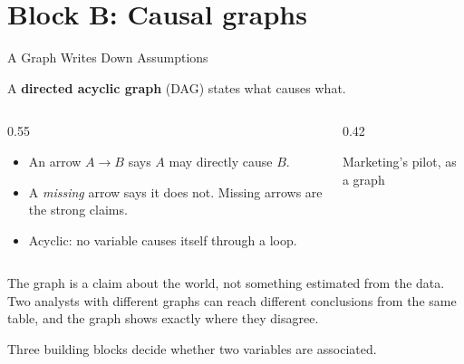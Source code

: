 \documentclass[aspectratio=169, 11pt, handout]{beamer}
\begin{document}
\section{Block B: Causal graphs}

\begin{frame}{A Graph Writes Down Assumptions}

A \textbf{directed acyclic graph} (DAG) states what causes what.

\begin{columns}[c]
\begin{column}{0.55\textwidth}
\begin{itemize}
  \item An arrow $A \to B$ says $A$ may directly cause $B$.
  \item A \emph{missing} arrow says it does not. Missing arrows are the strong claims.
  \item Acyclic: no variable causes itself through a loop.
\end{itemize}
\end{column}
\begin{column}{0.42\textwidth}
\centering
{}

\scriptsize Marketing's pilot, as a graph
\end{column}
\end{columns}

\bigskip

The graph is a claim about the world, not something estimated from the data. Two analysts with different graphs can reach different conclusions from the same table, and the graph shows exactly where they disagree.

\bigskip

Three building blocks decide whether two variables are associated.
\end{frame}
\end{document}
